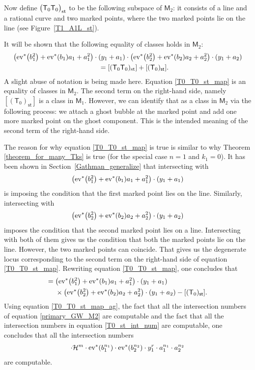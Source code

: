 \documentclass[pdftex]{sigma}
\numberwithin{equation}{section}
\begin{document}
Now define $\bigl(\mathsf{T}_0 \mathsf{T}_0\bigr)_{\textnormal{st}}$ to be the following subspace of $\mathsf{M}_2$:
it consists of a line and a rational curve and two marked points, where the two marked points lie on the line (see Figure~\ref{T1_A1L_st}).

It will be shown that the following equality of classes holds in $\mathsf{M}_2$:
\begin{gather}
\bigl({\rm ev}^*\bigl(b_1^2\bigr) + {\rm ev}^*(b_1) a_1 + a_1^2\bigr)\cdot (y_1 + a_1)
 \cdot \bigl({\rm ev}^*\bigl(b_2^2\bigr) + {\rm ev}^*(b_2) a_2 + a_2^2\bigr) \cdot (y_1 + a_2)\nonumber \\
\qquad = [(\mathsf{T}_0 \mathsf{T}_0)_{\textnormal{st}} ] +
[(\mathsf{T}_0)_{\textsf{st}}]. \label{T0_T0_st_map}
\end{gather}
A slight abuse of notation is being made here. Equation
\eqref{T0_T0_st_map} is an equality of classes in $\mathsf{M}_2$.
The second term on the right-hand side, namely $[(\mathsf{T}_0)_{\textsf{st}}]$ is a
class in
$\mathsf{M}_1$. However, we can identify that as a class in $\mathsf{M}_2$ via the following process: we attach a ghost bubble
at the marked point and add one more marked point on the ghost component.
This is the intended meaning of the second term of the right-hand side.

The reason for why equation \eqref{T0_T0_st_map} is true is similar to why
Theorem \ref{theorem_for_many_Tks} is true (for the special case $n = 1$ and $k_1 = 0$).
It has been shown in Section~\ref{Gathman_generalize} that intersecting with
\[\bigl({\rm ev}^*\bigl(b_1^2\bigr) + {\rm ev}^*(b_1) a_1 + a_1^2\bigr)\cdot (y_1 + a_1)\]
is imposing the condition that the first marked point lies on the line. Similarly, intersecting with
\[\bigl({\rm ev}^*\bigl(b_2^2\bigr) + {\rm ev}^*(b_2) a_2 + a_2^2\bigr) \cdot (y_1 + a_2)\]
imposes the condition that the second marked point lies on a line. Intersecting with both of them gives us the condition that
both the marked points lie on the line. However, the two marked points can coincide. That gives us the degenerate locus
corresponding to the second term on the right-hand side of equation \eqref{T0_T0_st_map}.
Rewriting equation \eqref{T0_T0_st_map}, one concludes that
\begin{align}
[(\mathsf{T}_0 \mathsf{T}_0)_{\textnormal{st}} ] = {}&
\bigl({\rm ev}^*\bigl(b_1^2\bigr) + {\rm ev}^*(b_1) a_1 + a_1^2\bigr)\cdot (y_1 + a_1) \nonumber \\
& \times \bigl({\rm ev}^*\bigl(b_2^2\bigr) + {\rm ev}^*(b_2) a_2 + a_2^2\bigr) \cdot (y_1 + a_2)
- [(\mathsf{T}_0)_{\textsf{st}}]. \label{T0_T0_st_map_ag}
\end{align}
Using equation \eqref{T0_T0_st_map_ag},
the fact that all the intersection numbers of equation \eqref{primary_GW_M2} are computable
and the fact that all the intersection numbers in equation \eqref{T0_st_int_num} are computable,
one concludes that all the intersection numbers
\begin{align}
[(\mathsf{T}_0 \mathsf{T}_0)_{\textnormal{st}} ]\cdot
\mathcal{H}^{m}\cdot {\rm ev}^*(b_1^{n_1}) \cdot
{\rm ev}^*(b_2^{n_2}) \cdot y_1^r \cdot a_1^{n_1} \cdot a_2^{n_2} \label{T0_T0_st_map_int_numbers}
\end{align}
are computable.
\end{document}
